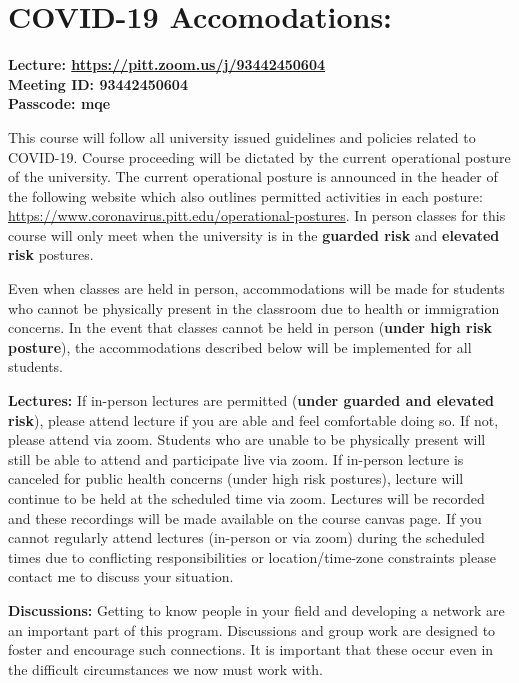 \documentclass[a4paper, 10pt]{article}
\begin{document}
\section*{COVID-19 Accomodations:}

\noindent\textbf{Lecture: \href{ https://pitt.zoom.us/j/93442450604}{ https://pitt.zoom.us/j/93442450604}\\
Meeting ID: 93442450604\\
Passcode: mqe\\}


This course will follow all university issued guidelines and policies related to COVID-19. Course proceeding will be dictated by the current operational posture of the university. The current operational posture  is announced in the header of the following website which also outlines permitted activities in each posture: \href{ https://www.coronavirus.pitt.edu/operational-postures}{https://www.coronavirus.pitt.edu/operational-postures}. In person classes for this course will only meet when the university is in the \textbf{guarded risk} and \textbf{elevated risk} postures.

\noindent Even when classes are held in person, accommodations will be made for students who cannot be physically present in the classroom due to health or immigration concerns. In the event that classes cannot be held in person (\textbf{under high risk posture}), the accommodations described below will be implemented for all students.

\noindent\textbf{Lectures:} If in-person lectures are permitted (\textbf{under guarded and elevated risk}), please attend lecture if you are able and feel comfortable doing so. If not, please attend via zoom. Students who are unable to be physically present will still be able to attend and participate live via zoom. If in-person lecture is canceled for public health concerns  (under high risk postures), lecture will continue to be held at the scheduled time via zoom.  Lectures will be recorded and these recordings will be made available on the course canvas page. If you cannot regularly attend lectures (in-person or via zoom) during the scheduled times due to conflicting responsibilities or location/time-zone constraints please contact me to discuss your situation. 




\noindent\textbf{Discussions:} Getting to know people in your field and developing a network are an important part of this program. Discussions and group work are designed to foster and encourage such connections. It is important that these occur even in the difficult circumstances we now must work with. 
\end{document}
